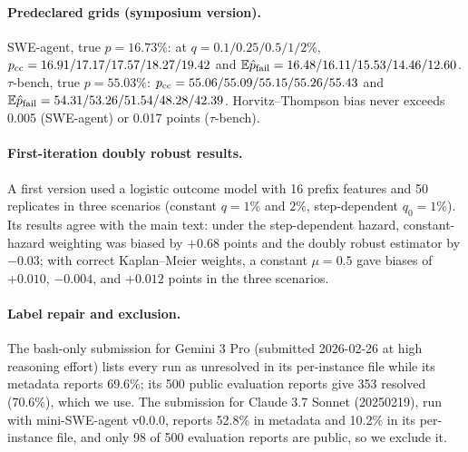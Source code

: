 \documentclass[11pt]{article}
\theoremstyle{definition}
\theoremstyle{remark}
\newcommand{\E}{\mathbb{E}}
\begin{document}
\paragraph{Predeclared grids (symposium version).} SWE-agent, true $p=16.73\%$:
at $q=0.1/0.25/0.5/1/2\%$, $p_{\rm cc}=16.91/17.17/17.57/18.27/19.42$ and
$\E\hat p_{\rm fail}=16.48/16.11/15.53/14.46/12.60$. $\tau$-bench, true
$p=55.03\%$: $p_{\rm cc}=55.06/55.09/55.15/55.26/55.43$ and
$\E\hat p_{\rm fail}=54.31/53.26/51.54/48.28/42.39$. Horvitz--Thompson bias never
exceeds 0.005 (SWE-agent) or 0.017 points ($\tau$-bench).

\paragraph{First-iteration doubly robust results.} A first version used a
logistic outcome model with 16 prefix features and 50 replicates in three
scenarios (constant $q=1\%$ and $2\%$, step-dependent $q_0=1\%$). Its results
agree with the main text: under the step-dependent hazard, constant-hazard
weighting was biased by $+0.68$ points and the doubly robust estimator by
$-0.03$; with correct Kaplan--Meier weights, a constant $\mu=0.5$ gave biases of
$+0.010$, $-0.004$, and $+0.012$ points in the three scenarios.

\paragraph{Label repair and exclusion.} The bash-only submission for Gemini 3 Pro
(submitted 2026-02-26 at high reasoning effort) lists every run as unresolved in its per-instance file while its metadata
reports 69.6\%; its 500 public evaluation reports give 353 resolved (70.6\%),
which we use. The submission for Claude 3.7 Sonnet (20250219), run with
mini-SWE-agent v0.0.0,
reports 52.8\% in metadata and 10.2\% in its per-instance file, and only 98 of
500 evaluation reports are public, so we exclude it.
\end{document}
